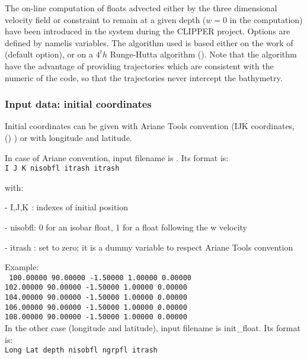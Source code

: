 \documentclass[../main/NEMO_manual]{subfiles}
\begin{document}

The on-line computation of floats advected either by the three dimensional velocity field or constraint to
remain at a given depth ($w = 0$ in the computation) have been introduced in the system during the CLIPPER project.
Options are defined by  namelis variables.
The algorithm used is based either on the work of \cite{Blanke_Raynaud_JPO97} (default option),
or on a $4^th$ Runge-Hutta algorithm ().
Note that the \cite{Blanke_Raynaud_JPO97} algorithm have the advantage of providing trajectories which
are consistent with the numeric of the code, so that the trajectories never intercept the bathymetry.

\subsubsection{Input data: initial coordinates}

Initial coordinates can be given with Ariane Tools convention
(IJK coordinates, () ) or with longitude and latitude.

In case of Ariane convention, input filename is .
Its format is: \\
{\scriptsize \texttt{I J K nisobfl itrash itrash}}

\noindent with:

 - I,J,K  : indexes of initial position

 - nisobfl: 0 for an isobar float, 1 for a float following the w velocity  

 - itrash : set to zero; it is a dummy variable to respect Ariane Tools convention

\noindent Example: \\
\noindent
{\scriptsize
  \texttt{
    100.00000  90.00000  -1.50000 1.00000   0.00000   \\
    102.00000  90.00000  -1.50000 1.00000   0.00000   \\
    104.00000  90.00000  -1.50000 1.00000   0.00000   \\
    106.00000  90.00000  -1.50000 1.00000   0.00000   \\
    108.00000  90.00000  -1.50000 1.00000   0.00000}
} \\

In the other case (longitude and latitude), input filename is init\_float.
Its format is: \\
{\scriptsize \texttt{Long Lat depth nisobfl ngrpfl itrash}}
\end{document}
